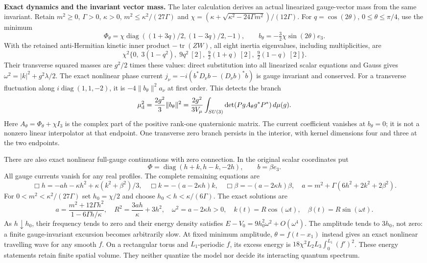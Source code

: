 \documentclass[10pt,letterpaper]{article}
\begin{document}
\noindent\textbf{Exact dynamics and the invariant vector mass.}
The later calculation derives an actual linearized gauge-vector mass
from the same invariant. Retain $m^2\geq0$, $\Gamma>0$, $\kappa>0$,
$m^2\leq\kappa^2/(27\Gamma)$ and
$\chi=(\kappa+\sqrt{\kappa^2-24\Gamma m^2})/(12\Gamma)$.
For $q=\cos(2\theta)$, $0\leq\theta\leq\pi/4$, use the minimum
\[
 \Phi_\theta=\chi\operatorname{diag}
       ((1+3q)/2,(1-3q)/2,-1),\qquad
 b_\theta=-\tfrac32\chi\sin(2\theta)e_3 .
\]
With the retained anti-Hermitian kinetic inner product $-\operatorname{tr}(ZW)$,
all eight inertia eigenvalues, including multiplicities, are
\[
 \chi^2\{0,\;3(1-q^2),\;
       9q^2\ [2],\;\tfrac92(1+q)\ [2],\;\tfrac92(1-q)\ [2]\}.
\]
Their transverse squared masses are $g^2/2$ times these values: direct
substitution into all linearized scalar equations and Gauss gives
$\omega^2=|k|^2+g^2\lambda/2$. The exact nonlinear phase current
$j_\nu=-i(b^*D_\nu b-(D_\nu b)^*b)$ is gauge invariant and conserved.
For a transverse fluctuation along $i\operatorname{diag}(1,1,-2)$,
it is $-4\|b_\theta\|^2 a_\nu$ at first order. This detects the branch
\[
 \mu_{\rm d}^2=\frac{2g^2}{3}\|b_\theta\|^2
 =\frac{2g^2}{3V_\mu}
       \int_{SU(3)}\det(PgA_\theta g^*P^*)\,d\mu(g).
\]
Here $A_\theta=\Phi_\theta+\chi I_3$ is the complex part of the
positive rank-one quaternionic matrix. The current coefficient vanishes
at $b_\theta=0$; it is not a nonzero linear interpolator at that endpoint.
One transverse zero branch persists in the interior, with kernel
dimensions four and three at the two endpoints.

There are also exact nonlinear full-gauge continuations with zero
connection. In the original scalar coordinates put
\[
 \Phi=\operatorname{diag}(h+k,h-k,-2h),\qquad b=\beta e_3.
\]
All gauge currents vanish for any real profiles. The complete remaining
equations are
\[
 \Box h=-ah-\kappa h^2+\kappa(k^2+\beta^2)/3,\quad
 \Box k=-(a-2\kappa h)k,\quad
 \Box\beta=-(a-2\kappa h)\beta,\quad
 a=m^2+\Gamma(6h^2+2k^2+2\beta^2).
\]
For $0<m^2<\kappa^2/(27\Gamma)$ set $h_0=\chi/2$ and choose
$h_0<h<\kappa/(6\Gamma)$. The exact solutions are
\[
 a=\frac{m^2+12\Gamma h^2}{1-6\Gamma h/\kappa},\quad
 R^2=\frac{3ah}{\kappa}+3h^2,\quad
 \omega^2=a-2\kappa h>0,\quad
 k(t)=R\cos(\omega t),\quad\beta(t)=R\sin(\omega t).
\]
As $h\downarrow h_0$, their frequency tends to zero and their
energy density satisfies $E-V_0=9h_0^2\omega^2+O(\omega^4)$.
The amplitude tends to $3h_0$, not zero: a finite gauge-invariant
excursion becomes arbitrarily slow. At fixed minimum amplitude,
$\theta=f(t-x_1)$ instead gives an exact nonlinear travelling wave
for any smooth $f$. On a rectangular torus and $L_1$-periodic $f$,
its excess energy is $18\chi^2L_2L_3\int_0^{L_1}(f')^2$.
These energy statements retain finite spatial volume. They neither
quantize the model nor decide its interacting quantum spectrum.
\end{document}
